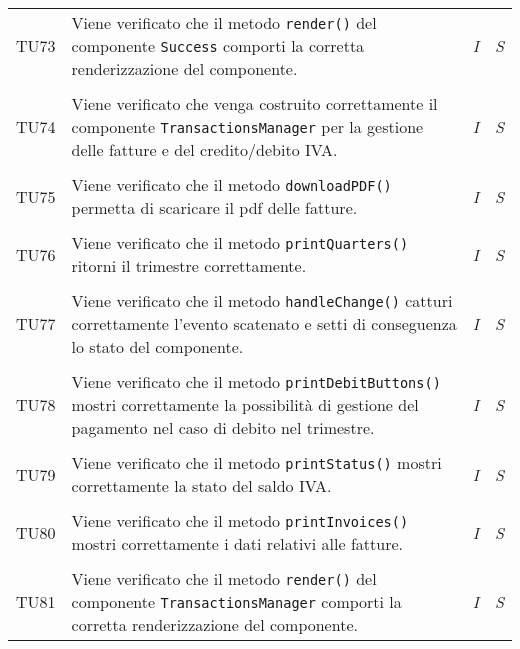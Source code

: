 \begin{longtable}{ >{\centering}p{} >{}p{}
				>{\centering}p{} >{\centering}p{}}
			\tabularnewline
			\hypertarget{TU73}{TU73} & Viene verificato che il metodo 
			\texttt{render()} del componente \texttt{Success} comporti 
			la corretta renderizzazione del componente. & 
			\textit{I} & 
			\textit{S}\\
						
			\tabularnewline
			\hypertarget{TU74}{TU74} & Viene verificato che venga 
			costruito correttamente il componente \texttt{TransactionsManager} 
			per la gestione delle fatture e del credito/debito IVA. & 
			\textit{I} & 
			\textit{S}\\
						
			\tabularnewline
			\hypertarget{TU75}{TU75} & Viene verificato che il metodo 
			\texttt{downloadPDF()} permetta di scaricare il pdf delle 
			fatture. & 
			\textit{I} & 
			\textit{S}\\
						
			\tabularnewline
			\hypertarget{TU76}{TU76} & Viene verificato che il metodo 
			\texttt{printQuarters()} ritorni il trimestre correttamente. & 
			\textit{I} & 
			\textit{S}\\
						
			\tabularnewline
			\hypertarget{TU77}{TU77} & Viene verificato che il metodo 
			\texttt{handleChange()} catturi correttamente l'evento scatenato 
			e setti di conseguenza lo stato del componente. & 
			\textit{I} & 
			\textit{S}\\
						
			\tabularnewline
			\hypertarget{TU78}{TU78} & Viene verificato che il metodo 
			\texttt{printDebitButtons()} mostri correttamente la possibilità 
			di gestione del pagamento nel caso di debito nel trimestre. & 
			\textit{I} & 
			\textit{S}\\
						
			\tabularnewline
			\hypertarget{TU79}{TU79} & Viene verificato che il metodo 
			\texttt{printStatus()} mostri correttamente la stato del saldo 
			IVA. & 
			\textit{I} & 
			\textit{S}\\
						
			\tabularnewline
			\hypertarget{TU80}{TU80} & Viene verificato che il metodo 
			\texttt{printInvoices()} mostri correttamente i dati relativi 
			alle fatture. & 
			\textit{I} & 
			\textit{S}\\

			\tabularnewline
			\hypertarget{TU81}{TU81} & Viene verificato che il metodo 
			\texttt{render()} del componente \texttt{TransactionsManager} 
			comporti la corretta renderizzazione del componente. & 
			\textit{I} & 
			\textit{S}\\
			

\end{longtable}
